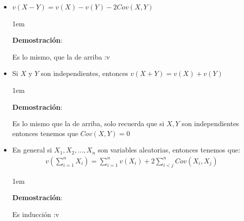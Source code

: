\documentclass[12pt, fleqn]{report}                             %
\newenvironment{SmallIndentation}[1][0.75em]                    %
        {\begin{adjustwidth}{#1}{}\begin{footnotesize}}             %
        {\end{footnotesize}\end{adjustwidth}}                       %
\theoremstyle{break}                                            %
\newcommand{\Wrap}[1]{\left( #1 \right)}                        %
\begin{document}
\begin{itemize}
\begin{SmallIndentation}[1em]
                        \end{SmallIndentation}

                    \clearpage

                    \item 
                        $v(X - Y) = v(X) - v(Y) - 2Cov(X,Y)$

                        \begin{SmallIndentation}[1em]
                            \textbf{Demostración}:
                            
                            Es lo mismo, que la de arriba :v
                        
                        \end{SmallIndentation}
                            

                    \item
                        Si $X$ y $Y$ son independientes, entonces $v(X + Y) = v(X) + v(Y)$

                        \begin{SmallIndentation}[1em]
                            \textbf{Demostración}:
                            
                            Es lo mismo que la de arriba, solo recuerda que si $X, Y$ son independientes
                            entonces tenemos que $Cov(X, Y) = 0$
                        
                        \end{SmallIndentation}
                            

                    \item
                        En general si $X_1, X_2, \dots, X_n$ son variables aleatorias, entonces
                        tenemos que:
                        \begin{align*}
                            v\Wrap{\sum_{i = 1}^n X_i} = \sum_{i = 1}^n v(X_i) + 2\sum_{i < j}^n Cov(X_i, X_j)
                        \end{align*}

                        \begin{SmallIndentation}[1em]
                            \textbf{Demostración}:
                            
                            Es inducción :v
                        
                        \end{SmallIndentation}
                            

                    \end{itemize}
                            
\end{document}
